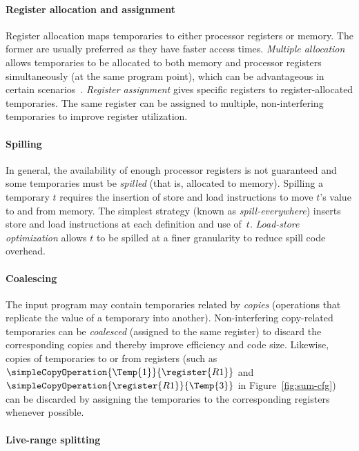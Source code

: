\documentclass[acmsmall,authorversion,nonacm]{acmart}
\begin{document}
\paragraph{Register allocation and assignment}

Register allocation maps temporaries to either processor registers or
memory.
The former are usually preferred as they have faster access times.
\emph{Multiple allocation} allows temporaries to be allocated to both
memory and processor registers simultaneously (at the same program
point), which can be advantageous in certain scenarios~\cite[Section
  2.2]{Colombet2015}.
\emph{Register assignment} gives specific registers to
register-allocated temporaries.
The same register can be assigned to multiple, non-interfering
temporaries to improve register utilization.

\paragraph{Spilling}

In general, the availability of enough processor registers is not
guaranteed and some temporaries must be \emph{spilled} (that is,
allocated to memory).
Spilling a temporary $t$ requires the insertion of store and load
instructions to move $t$'s value to and from memory.
The simplest strategy (known as \emph{spill-everywhere}) inserts store
and load instructions at each definition and use of~$t$.
\emph{Load-store optimization} allows $t$ to be spilled at a finer
granularity to reduce spill code overhead.

\paragraph{Coalescing}

The input program may contain temporaries related by \emph{copies}
(operations that replicate the value of a temporary into another).
Non-interfering copy-related temporaries can be \emph{coalesced}
(assigned to the same register) to discard the corresponding copies
and thereby improve efficiency and code size.
Likewise, copies of temporaries to or from registers (such as
$\simpleCopyOperation{\Temp{1}}{\register{R1}}$ and
$\simpleCopyOperation{\register{R1}}{\Temp{3}}$ in
Figure~\ref{fig:sum-cfg}) can be discarded by assigning the
temporaries to the corresponding registers whenever possible.

\paragraph{Live-range splitting}
\end{document}
